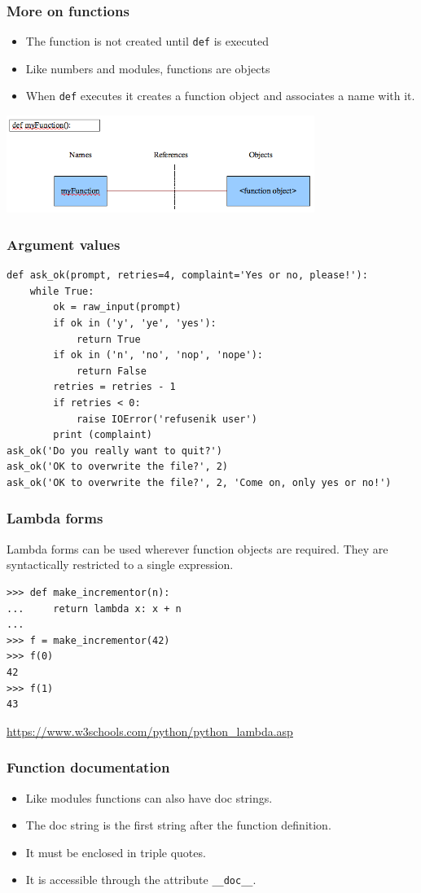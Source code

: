 \documentclass{beamer}
\begin{document}
\begin{frame}
\frametitle{More on functions}
\begin{itemize}
\item The function is not created until \texttt{def} is executed
\item Like numbers and modules, functions are objects
\item When \texttt{def} executes it creates a function object and associates a name with it.
\end{itemize}
\begin{center}
\includegraphics[width=10cm]{functions_1}
\end{center}
\end{frame}

\begin{frame}[containsverbatim]
\frametitle{Argument values}
\begin{lstlisting}
def ask_ok(prompt, retries=4, complaint='Yes or no, please!'):
    while True:
        ok = raw_input(prompt)
        if ok in ('y', 'ye', 'yes'):
            return True
        if ok in ('n', 'no', 'nop', 'nope'):
            return False
        retries = retries - 1
        if retries < 0:
            raise IOError('refusenik user')
        print (complaint)
ask_ok('Do you really want to quit?')
ask_ok('OK to overwrite the file?', 2)
ask_ok('OK to overwrite the file?', 2, 'Come on, only yes or no!')
\end{lstlisting}
\end{frame}

\begin{frame}[containsverbatim]
\frametitle{Lambda forms}
Lambda forms can be used wherever function objects are required. They are syntactically restricted to a single expression. 
\begin{lstlisting}
>>> def make_incrementor(n):
...     return lambda x: x + n
...
>>> f = make_incrementor(42)
>>> f(0)
42
>>> f(1)
43
\end{lstlisting}
\url{https://www.w3schools.com/python/python_lambda.asp}
\end{frame}

\begin{frame}
\frametitle{Function documentation}
\begin{itemize}
\item Like modules functions can also have doc strings.
\item The doc string is the first string after the function definition.
\item It must be enclosed in triple quotes.
\item It is accessible through the attribute \texttt{\_\_doc\_\_}.
\end{itemize}
\end{frame}
\end{document}
